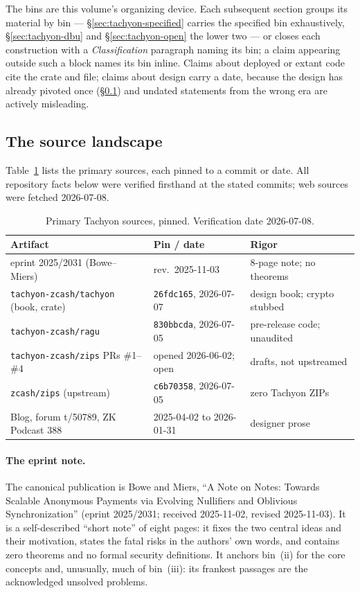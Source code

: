 \documentclass[11pt,a4paper]{article}
\theoremstyle{definition}
\begin{document}
The bins are this volume's organizing device. Each subsequent section groups
its material by bin --- \S\ref{sec:tachyon-specified} carries the specified
bin exhaustively, \S\ref{sec:tachyon-dbu} and \S\ref{sec:tachyon-open} the
lower two --- or closes each construction with a \emph{Classification}
paragraph naming its bin; a claim appearing outside such a block names its
bin inline. Claims about deployed or extant code cite
the crate and file; claims about design carry a date, because the design has
already pivoted once (\S\ref{sec:tachyon-sources}) and undated statements from
the wrong era are actively misleading.

\subsection{The source landscape}\label{sec:tachyon-sources}

Table~\ref{tab:tachyon-sources} lists the primary sources, each pinned to a
commit or date. All repository facts below were verified firsthand at the
stated commits; web sources were fetched 2026-07-08.

\begin{table}[htbp]
\centering
\small
\begin{tabular}{@{}lll@{}}
\toprule
Artifact & Pin / date & Rigor \\
\midrule
eprint 2025/2031 (Bowe--Miers)
  & rev.\ 2025-11-03            & 8-page note; no theorems \\
\texttt{tachyon-zcash/tachyon} (book, crate)
  & \texttt{26fdc165}, 2026-07-07 & design book; crypto stubbed \\
\texttt{tachyon-zcash/ragu}
  & \texttt{830bbcda}, 2026-07-05 & pre-release code; unaudited \\
\texttt{tachyon-zcash/zips} PRs \#1--\#4
  & opened 2026-06-02; open     & drafts, not upstreamed \\
\texttt{zcash/zips} (upstream)
  & \texttt{c6b70358}, 2026-07-05 & zero Tachyon ZIPs \\
Blog, forum t/50789, ZK Podcast 388
  & 2025-04-02 to 2026-01-31    & designer prose \\
\bottomrule
\end{tabular}
\caption{Primary Tachyon sources, pinned. Verification date 2026-07-08.}
\label{tab:tachyon-sources}
\end{table}

\paragraph{The eprint note.} The canonical publication is Bowe and Miers, ``A
Note on Notes: Towards Scalable Anonymous Payments via Evolving Nullifiers and
Oblivious Synchronization'' (eprint 2025/2031; received 2025-11-02, revised
2025-11-03). It is a self-described ``short note'' of eight pages: it fixes
the two central ideas and their motivation, states the fatal risks in the
authors' own words, and contains zero theorems and no formal security
definitions. It anchors bin~(ii) for the core concepts and, unusually, much of
bin~(iii): its frankest passages are the acknowledged unsolved problems.
\end{document}

